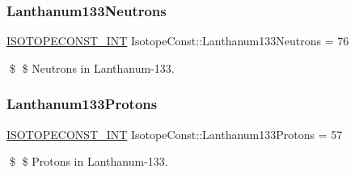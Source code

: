 \subsubsection{\texorpdfstring{Lanthanum133\+Neutrons}{Lanthanum133Neutrons}}
{\footnotesize\ttfamily \mbox{\hyperlink{group___isotope_const-_macros_ga5f18360b3e99483a35c32d789e62621c}{I\+S\+O\+T\+O\+P\+E\+C\+O\+N\+S\+T\+\_\+\+I\+NT}} Isotope\+Const\+::\+Lanthanum133\+Neutrons = 76}

\$ \$ Neutrons in Lanthanum-\/133. \mbox{\label{group___isotope_const-_lanthanum-_la133_ga51f6008bb477c6a93df0a9a28bbe5048}} 
\subsubsection{\texorpdfstring{Lanthanum133\+Protons}{Lanthanum133Protons}}
{\footnotesize\ttfamily \mbox{\hyperlink{group___isotope_const-_macros_ga5f18360b3e99483a35c32d789e62621c}{I\+S\+O\+T\+O\+P\+E\+C\+O\+N\+S\+T\+\_\+\+I\+NT}} Isotope\+Const\+::\+Lanthanum133\+Protons = 57}

\$ \$ Protons in Lanthanum-\/133. 